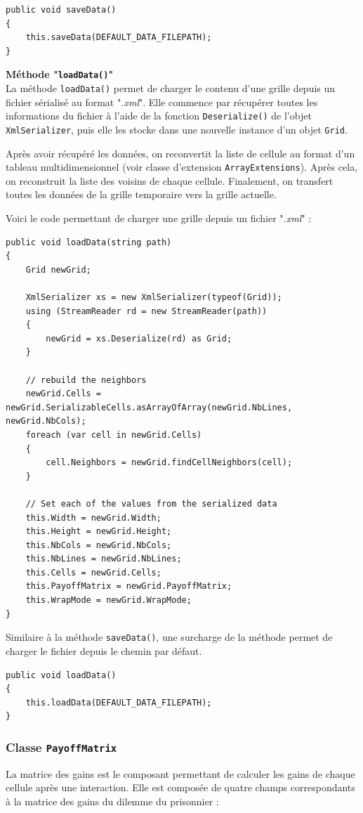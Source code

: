 \documentclass[a4paper]{article}
\begin{document}
\begin{lstlisting}
public void saveData()
{
    this.saveData(DEFAULT_DATA_FILEPATH);
}
\end{lstlisting}

\pagebreak
\textbf{Méthode "\texttt{loadData()}"}\\
La méthode \texttt{loadData()} permet de charger le contenu d'une grille depuis un fichier sérialisé au format "\textit{.xml}". Elle commence par récupérer toutes les informations du fichier à l'aide de la fonction \texttt{Deserialize()} de l'objet \texttt{XmlSerializer}, puis elle les stocke dans une nouvelle instance d'un objet \texttt{Grid}.

Après avoir récupéré les données, on reconvertit la liste de cellule au format d'un tableau multidimensionnel (voir classe d'extension \texttt{ArrayExtensions}). Après cela, on reconstruit la liste des voisins de chaque cellule. Finalement, on transfert toutes les données de la grille temporaire vers la grille actuelle.

Voici le code permettant de charger une grille depuis un fichier "\textit{.xml}" :
\begin{lstlisting}
public void loadData(string path)
{
    Grid newGrid;

    XmlSerializer xs = new XmlSerializer(typeof(Grid));
    using (StreamReader rd = new StreamReader(path))
    {
        newGrid = xs.Deserialize(rd) as Grid;
    }

    // rebuild the neighbors
    newGrid.Cells = newGrid.SerializableCells.asArrayOfArray(newGrid.NbLines, newGrid.NbCols);
    foreach (var cell in newGrid.Cells)
    {
        cell.Neighbors = newGrid.findCellNeighbors(cell);
    }

    // Set each of the values from the serialized data
    this.Width = newGrid.Width;
    this.Height = newGrid.Height;
    this.NbCols = newGrid.NbCols;
    this.NbLines = newGrid.NbLines;
    this.Cells = newGrid.Cells;
    this.PayoffMatrix = newGrid.PayoffMatrix;
    this.WrapMode = newGrid.WrapMode;
}
\end{lstlisting}

Similaire à la méthode \texttt{saveData()}, une surcharge de la méthode permet de charger le fichier depuis le chemin par défaut.

\begin{lstlisting}
public void loadData()
{
    this.loadData(DEFAULT_DATA_FILEPATH);
}
\end{lstlisting}
\pagebreak
\subsubsection{Classe \texttt{PayoffMatrix}}
La matrice des gains est le composant permettant de calculer les gains de chaque cellule après une interaction. Elle est composée de quatre champs correspondants à la matrice des gains du dilemme du prisonnier :
\end{document}
